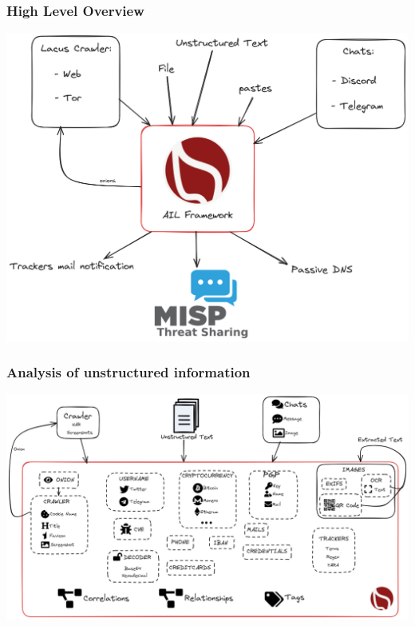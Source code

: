 \documentclass[10pt,aspectratio=169, colorlinks=true, linkcolor=circlBlue]{beamer}
\begin{document}

\begin{frame}
    \frametitle{High Level Overview}
    \begin{center}
        \includegraphics[scale=0.24]{images/ail-overview.png}
    \end{center}
\end{frame}


\begin{frame}
    \frametitle{Analysis of unstructured information}
    \begin{center}
        \includegraphics[scale=0.225]{images/ail-internal.png}
    \end{center}
\end{frame}
\end{document}

